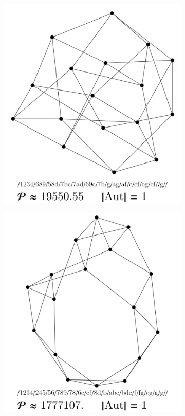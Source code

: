 \documentclass[12pt,a4paper]{article}
\renewcommand{\|}{\rule[-0.4ex]{0.2ex}{1.2em}}
\begin{document}
\begin{figure}[htb]
\begin{subfigure}[b]{.24 \textwidth}
		\includegraphics[width=\linewidth]{smallest_15_2}
		\subcaption{}
	\end{subfigure}
	\begin{subfigure}[b]{.24 \textwidth}
		\includegraphics[width=\linewidth]{largest_15_2}

\end{subfigure}
\end{figure}
\end{document}
